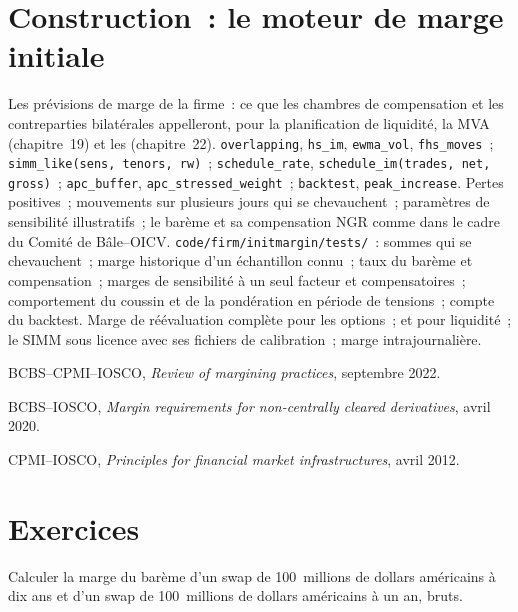 \section{Construction~: le moteur de marge initiale}\label{bld:rc:margin-models:initmargin}

\begin{build}
 Les prévisions de marge de la firme~: ce que les chambres de compensation et les contreparties
bilatérales appelleront, pour la planification de liquidité, la MVA (chapitre~19) et les  (chapitre~22).
 \texttt{overlapping}, \texttt{hs\_im}, \texttt{ewma\_vol}, \texttt{fhs\_moves}~;
\texttt{simm\_like(sens, tenors, rw)}~; \texttt{schedule\_rate}, \texttt{schedule\_im(trades, net,
gross)}~; \texttt{apc\_buffer}, \texttt{apc\_stressed\_weight}~; \texttt{backtest}, \texttt{peak\_increase}.
 Pertes positives~; mouvements sur plusieurs jours qui se chevauchent~; paramètres de sensibilité illustratifs~;
le barème et sa compensation NGR comme dans le cadre du Comité de Bâle--OICV.
 \texttt{code/firm/initmargin/tests/}~: sommes qui se chevauchent~; marge historique
d'un échantillon connu~; taux du barème et compensation~; marges de sensibilité à un seul facteur et compensatoires~; comportement du coussin
et de la pondération en période de tensions~; compte du backtest.
 Marge de réévaluation complète pour les options~;  et pour liquidité~; le SIMM
sous licence avec ses fichiers de calibration~; marge intrajournalière.
\end{build}

\begin{omsources}
\item BCBS--CPMI--IOSCO, \emph{Review of margining practices}, septembre 2022.
\item BCBS--IOSCO, \emph{Margin requirements for non-centrally cleared derivatives}, avril 2020.
\item CPMI--IOSCO, \emph{Principles for financial market infrastructures}, avril 2012.
\end{omsources}

\section{Exercices}

\begin{exercise}[$\star$]\label{exo:rc:margin-models:1}
Calculer la marge du barème d'un swap de 100~millions de dollars américains à dix ans et d'un swap de
100~millions de dollars américains à un an, bruts.
\end{exercise}

